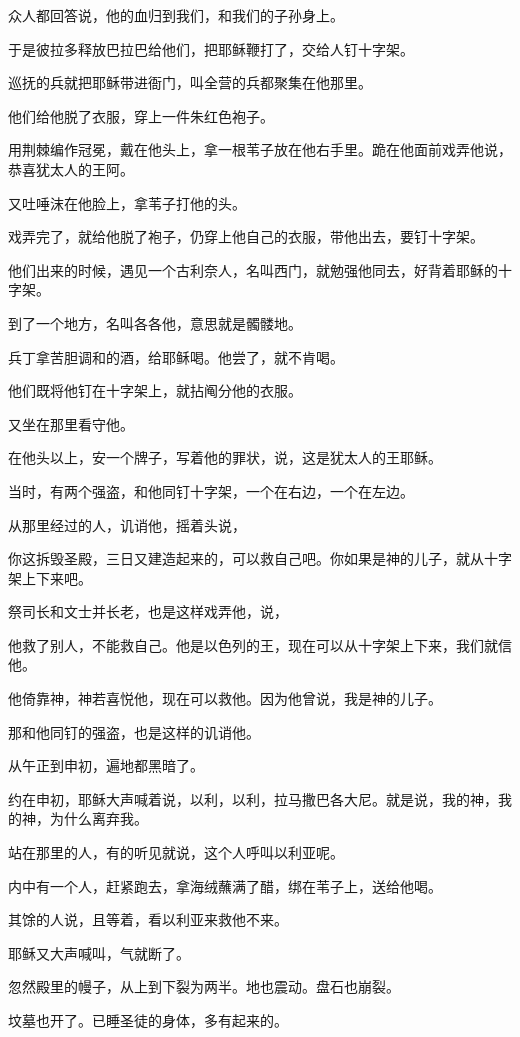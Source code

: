 \documentclass[12pt,oneside]{book}
\begin{document}
众人都回答说，他的血归到我们，和我们的子孙身上。

于是彼拉多释放巴拉巴给他们，把耶稣鞭打了，交给人钉十字架。

巡抚的兵就把耶稣带进衙门，叫全营的兵都聚集在他那里。

他们给他脱了衣服，穿上一件朱红色袍子。

用荆棘编作冠冕，戴在他头上，拿一根苇子放在他右手里。跪在他面前戏弄他说，恭喜犹太人的王阿。

又吐唾沫在他脸上，拿苇子打他的头。

戏弄完了，就给他脱了袍子，仍穿上他自己的衣服，带他出去，要钉十字架。

他们出来的时候，遇见一个古利奈人，名叫西门，就勉强他同去，好背着耶稣的十字架。

到了一个地方，名叫各各他，意思就是髑髅地。

兵丁拿苦胆调和的酒，给耶稣喝。他尝了，就不肯喝。

他们既将他钉在十字架上，就拈阄分他的衣服。

又坐在那里看守他。

在他头以上，安一个牌子，写着他的罪状，说，这是犹太人的王耶稣。

当时，有两个强盗，和他同钉十字架，一个在右边，一个在左边。

从那里经过的人，讥诮他，摇着头说，

你这拆毁圣殿，三日又建造起来的，可以救自己吧。你如果是神的儿子，就从十字架上下来吧。

祭司长和文士并长老，也是这样戏弄他，说，

他救了别人，不能救自己。他是以色列的王，现在可以从十字架上下来，我们就信他。

他倚靠神，神若喜悦他，现在可以救他。因为他曾说，我是神的儿子。

那和他同钉的强盗，也是这样的讥诮他。

从午正到申初，遍地都黑暗了。

约在申初，耶稣大声喊着说，以利，以利，拉马撒巴各大尼。就是说，我的神，我的神，为什么离弃我。

站在那里的人，有的听见就说，这个人呼叫以利亚呢。

内中有一个人，赶紧跑去，拿海绒蘸满了醋，绑在苇子上，送给他喝。

其馀的人说，且等着，看以利亚来救他不来。

耶稣又大声喊叫，气就断了。

忽然殿里的幔子，从上到下裂为两半。地也震动。盘石也崩裂。

坟墓也开了。已睡圣徒的身体，多有起来的。
\end{document}
